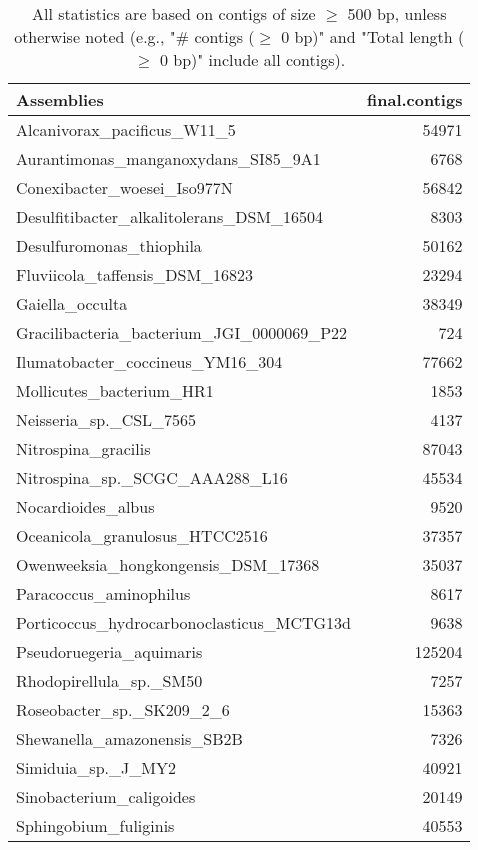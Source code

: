 \documentclass[12pt,a4paper]{article}
\begin{document}
\begin{table}[ht]
\begin{center}
\caption{All statistics are based on contigs of size $\geq$ 500 bp, unless otherwise noted (e.g., "\# contigs ($\geq$ 0 bp)" and "Total length ($\geq$ 0 bp)" include all contigs).}
\begin{tabular}{|l*{1}{|r}|}
\hline
Assemblies & final.contigs \\ \hline
Alcanivorax\_pacificus\_W11\_5 & 54971 \\ \hline
Aurantimonas\_manganoxydans\_SI85\_9A1 & 6768 \\ \hline
Conexibacter\_woesei\_Iso977N & 56842 \\ \hline
Desulfitibacter\_alkalitolerans\_DSM\_16504 & 8303 \\ \hline
Desulfuromonas\_thiophila & 50162 \\ \hline
Fluviicola\_taffensis\_DSM\_16823 & 23294 \\ \hline
Gaiella\_occulta & 38349 \\ \hline
Gracilibacteria\_bacterium\_JGI\_0000069\_P22 & 724 \\ \hline
Ilumatobacter\_coccineus\_YM16\_304 & 77662 \\ \hline
Mollicutes\_bacterium\_HR1 & 1853 \\ \hline
Neisseria\_sp.\_CSL\_7565 & 4137 \\ \hline
Nitrospina\_gracilis & 87043 \\ \hline
Nitrospina\_sp.\_SCGC\_AAA288\_L16 & 45534 \\ \hline
Nocardioides\_albus & 9520 \\ \hline
Oceanicola\_granulosus\_HTCC2516 & 37357 \\ \hline
Owenweeksia\_hongkongensis\_DSM\_17368 & 35037 \\ \hline
Paracoccus\_aminophilus & 8617 \\ \hline
Porticoccus\_hydrocarbonoclasticus\_MCTG13d & 9638 \\ \hline
Pseudoruegeria\_aquimaris & 125204 \\ \hline
Rhodopirellula\_sp.\_SM50 & 7257 \\ \hline
Roseobacter\_sp.\_SK209\_2\_6 & 15363 \\ \hline
Shewanella\_amazonensis\_SB2B & 7326 \\ \hline
Simiduia\_sp.\_J\_MY2 & 40921 \\ \hline
Sinobacterium\_caligoides & 20149 \\ \hline
Sphingobium\_fuliginis & 40553 \\ \hline

\end{tabular}
\end{center}
\end{table}
\end{document}
